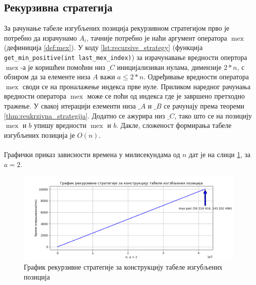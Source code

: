 \documentclass[a4paper]{article}
\DeclareMathOperator{\mex}{mex}
\begin{document}

\subsection{Рекурзивна стратегија}

За рачунање табеле изгубљених позиција рекурзивном стратегијом прво је потребно да израчунамо $ A_{i} $, тачније потребно је наћи аргумент оператора $ \mex $ (дефиниција \ref{def:mex}). У коду \ref{lst:recursive_strategy} (функција \verb|get_min_positive(int last_mex_index)|) за израчунавање вредности опертора $ \mex $-а је коришћен помоћни низ $ \_C $ иницијализиван нулама, димензије $ 2*n $, с обзиром да за елементе низа $ A $ важи $ a \leq 2*n $. Одређивање вредности оператора $ \mex $  своди се на проналажење индекса прве нуле. Приликом наредног рачунања вредности оператора $ \mex $ може се поћи од индекса где је завршено претходно тражење. У свакој итерацији елементи низа $ \_A $ и $ \_B $ се рачунају према теореми \ref{thm:reukrzivna_strategija}. Додатно се ажурира низ $ \_C $, тако што се на позицију $ \mex $ и $ b $ упишу вредности $ \mex $ и $ b $. Дакле, сложеност формирања табеле изгубљених позиција је $ O(n) $.\\



\leavevmode\\
Графички приказ зависности времена у милисекундама од $ n $ дат је на слици \ref{fig:recursive}, за $ a = 2 $.

\begin{figure}[H]
	\begin{center}
		\includegraphics[width=\textwidth]{recursive.png}
	\end{center}
	\caption{График рекурзивне стратегије за конструкцију табеле изгубљених позиција}
	\label{fig:recursive}
\end{figure}
\end{document}

